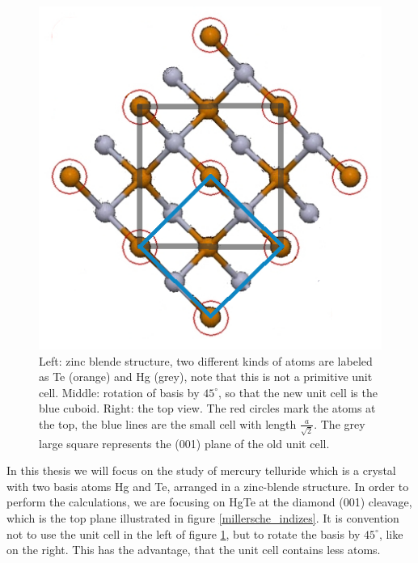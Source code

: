 \begin{figure}[tbp]
\begin{minipage}[c]{.32\linewidth}
		\end{minipage}
		\hfill
		\begin{minipage}[c]{.32\linewidth}
			\centering
			\includegraphics[width=.9\linewidth]{andere_bilder/001_plane_2.jpg}
		\end{minipage}
		\caption{Left: zinc blende structure, two different kinds of atoms are labeled as Te (orange) and Hg (grey), note that this is not a primitive unit cell. Middle: rotation of basis by $45^\circ$, so that the new unit cell is the blue cuboid. Right: the top view. The red circles mark the atoms at the top, the blue lines are the small cell with length $\frac{a}{\sqrt{2}}$. The grey large square represents the (001) plane of the old unit cell.} \label{hgte_diamond001}
	\end{figure}
	
	In this thesis we will focus on the study of mercury telluride which is a crystal with two basis atoms Hg and Te, arranged in a zinc-blende structure. 
	In order to perform the calculations, we are focusing on HgTe at the diamond (001) cleavage, which is the top plane illustrated in figure \ref{millersche_indizes}. It is convention not to use the unit cell in the left of figure \ref{hgte_diamond001}, but to rotate the basis by $45^{\circ}$, like on the right. This has the advantage, that the unit cell contains less atoms. 
	
